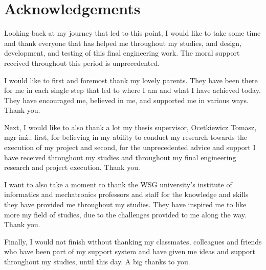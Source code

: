 


\section*{\centering \Large Acknowledgements}

\begin{acknowledgements}

    Looking back at my journey that led to this point, I would like to take some time and thank everyone that has helped me throughout my studies, and design, development, and testing of this final engineering work. The moral support received throughout this period is unprecedented.

    I would like to first and foremost thank my lovely parents. They have been there for me in each single step that led to where I am and what I have achieved today. They have encouraged me, believed in me, and supported me in various ways. Thank you.

    Next, I would like to also thank a lot my thesis supervisor, Ocetkiewicz Tomasz, mgr inż.; first, for believing in my ability to conduct my research towards the execution of my project and second, for the unprecedented advice and support I have received throughout my studies and throughout my final engineering research and project execution. Thank you.

    I want to also take a moment to thank the WSG university’s institute of informatics and mechatronics professors and staff for the knowledge and skills they have provided me throughout my studies. They have inspired me to like more my field of studies, due to the challenges provided to me along the way. Thank you.

    Finally, I would not finish without thanking my classmates, colleagues and friends who have been part of my support system and have given me ideas and support throughout my studies, until this day. A big thanks to you.


\end{acknowledgements}

